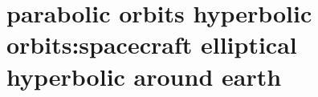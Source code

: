 \section{ parabolic orbits hyperbolic orbits:spacecraft elliptical hyperbolic around earth  }\label{sec:q2}    
